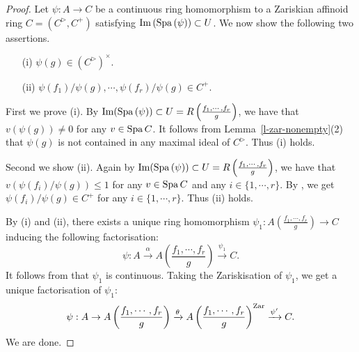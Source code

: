 \begin{proof}
Let $\psi:A \to C$ be a continuous ring homomorphism 
to a Zariskian affinoid ring $C=(C^{\rhd}, C^+)$ 
satisfying ${\rm Im}\,({\operatorname{Spa}}\,(\psi)) \subset U$. 
We now show the following two assertions. 
\begin{enumerate}
\item[(i)] $\psi(g) \in (C^{\rhd})^{\times}$. 
\item[(ii)] $\psi(f_1)/\psi(g), \cdots, \psi(f_r)/\psi(g) \in C^+$. 
\end{enumerate}

First we prove (i). 
By ${\operatorname{Im}}({\operatorname{Spa}}\,(\psi)) \subset U=R\left(\frac{f_1, \cdots, f_r}{g}\right)$, 
we have that $v(\psi(g)) \neq 0$ for any $v \in {\operatorname{Spa}}\,C$. 
It follows from Lemma~\ref{l-zar-nonempty}(2) that 
$\psi(g)$ is not contained in any maximal ideal of $C^{\rhd}$. 
Thus (i) holds. 

Second we show (ii). 
Again by ${\operatorname{Im}}({\operatorname{Spa}}\,(\psi)) \subset U=R\left(\frac{f_1, \cdots, f_r}{g}\right)$, 
we have that $v(\psi(f_i)/\psi(g)) \leq 1$ 
for any $v \in {\operatorname{Spa}}\,C$ and any $i \in \{1, \cdots, r\}$. 
By \cite[Lemma 3.3(i)]{Hub93}, we get $\psi(f_i)/\psi(g) \in C^+$ 
for any $i \in \{1, \cdots, r\}$. 
Thus (ii) holds. 

\medskip

By (i) and (ii), 
there exists a unique ring homomorphism 
$\psi_1:A\left(\frac{f_1, \cdots, f_r}{g}\right) \to C$ 
inducing the following factorisation:  
$$\psi:A \xrightarrow{\alpha} A\left(\frac{f_1, \cdots, f_r}{g}\right) \xrightarrow{\psi_1} C.$$
It follows from \cite[(1.2)(ii)]{Hub94} that $\psi_1$ is continuous. 
Taking the Zariskisation of $\psi_1$, we get a unique factorisation of $\psi_1$: 
$$\psi:A \to A\left(\frac{f_1, \cdots, f_r}{g}\right) \xrightarrow{\theta} A\left(\frac{f_1, \cdots, f_r}{g}\right)^{{\operatorname{Zar}}} \xrightarrow{\psi'} C.$$
We are done. 
\end{proof}





